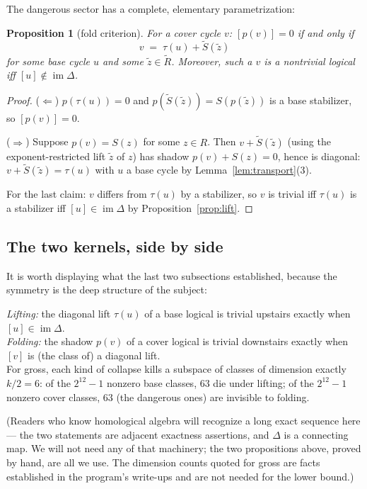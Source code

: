 \documentclass[11pt]{article}
\theoremstyle{plain}
\newtheorem{proposition}[theorem]{Proposition}
\theoremstyle{definition}
\theoremstyle{remark}
\newcommand{\imD}{\operatorname{im}\Delta}
\newcommand{\Rbase}{R}
\newcommand{\Rcov}{\widetilde{R}}
\begin{document}
The dangerous sector has a complete, elementary parametrization:

\begin{proposition}[fold criterion]\label{prop:fold}
For a cover cycle $v$: $[p(v)] = 0$ if and only if
\[
v \;=\; \tau(u) + \widetilde S(\widetilde z)
\]
for some base cycle $u$ and some $\widetilde z \in \Rcov$. Moreover, such a
$v$ is a \emph{nontrivial} logical iff $[u] \notin \imD$.
\end{proposition}

\begin{proof}
($\Leftarrow$) $p(\tau(u)) = 0$ and $p(\widetilde S(\widetilde z)) =
S(p(\widetilde z))$ is a base stabilizer, so $[p(v)] = 0$.

($\Rightarrow$) Suppose $p(v) = S(z)$ for some $z \in \Rbase$. Then $v +
\widetilde S(\widetilde z)$ (using the exponent-restricted lift $\widetilde z$
of $z$) has shadow $p(v) + S(z) = 0$, hence is diagonal: $v + \widetilde
S(\widetilde z) = \tau(u)$ with $u$ a base cycle by
Lemma~\ref{lem:transport}(3).

For the last claim: $v$ differs from $\tau(u)$ by a stabilizer, so $v$ is
trivial iff $\tau(u)$ is a stabilizer iff $[u] \in \imD$ by
Proposition~\ref{prop:lift}.
\end{proof}

\subsection{The two kernels, side by side}

It is worth displaying what the last two subsections established, because the
symmetry is the deep structure of the subject:

\begin{keyidea}
\emph{Lifting:} the diagonal lift $\tau(u)$ of a base logical is trivial
upstairs exactly when $[u] \in \imD$.\\[2pt]
\emph{Folding:} the shadow $p(v)$ of a cover logical is trivial downstairs
exactly when $[v]$ is (the class of) a diagonal lift.\\[4pt]
For gross, each kind of collapse kills a subspace of classes of dimension
exactly $k/2 = 6$: of the $2^{12}{-}1$ nonzero base classes, $63$ die under
lifting; of the $2^{12}{-}1$ nonzero cover classes, $63$ (the dangerous ones)
are invisible to folding.
\end{keyidea}

(Readers who know homological algebra will recognize a long exact sequence
here --- the two statements are adjacent exactness assertions, and $\Delta$ is
a connecting map. We will not need any of that machinery; the two propositions
above, proved by hand, are all we use. The dimension counts quoted for gross
are facts established in the program's write-ups and are not needed for the
lower bound.)
\end{document}
